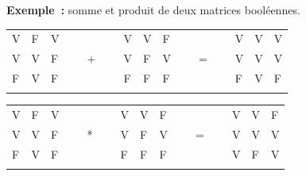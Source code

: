 			\textbf{Exemple~:} somme et produit de deux matrices booléennes.

			\begin{center}
				\tablefirsthead{}
				\tablehead{}
				\tabletail{}
				\tablelasttail{}
				\begin{supertabular}{|m{0.601cm}|m{0.601cm}|m{0.601cm}|m{0.601cm}m{0.601cm}m{0.601cm}|m{0.601cm}|m{0.601cm}|m{0.601cm}|m{0.601cm}m{0.601cm}m{0.601cm}|m{0.601cm}|m{0.601cm}|m{0.61800003cm}|}
				\hhline{---~~~---~~~---}
				{ V} &
				{ F} &
				{ V} &
				~
				 &
				~
				 &
				~
				 &
				{ V} &
				{ V} &
				{ F} &
				~
				 &
				~
				 &
				~
				 &
				{ V} &
				{ V} &
				{ V}\\\hhline{---~~~---~~~---}
				{ V} &
				{ V} &
				{ F} &
				~
				 &
				{ +} &
				~
				 &
				{ V} &
				{ F} &
				{ V} &
				~
				 &
				{ =} &
				~
				 &
				{ V} &
				{ V} &
				{ V}\\\hhline{---~~~---~~~---}
				{ F} &
				{ V} &
				{ F} &
				~
				 &
				~
				 &
				~
				 &
				{ F} &
				{ F} &
				{ F} &
				~
				 &
				~
				 &
				~
				 &
				{ F} &
				{ V} &
				{ F}\\\hhline{---~~~---~~~---}
				\end{supertabular}
			\end{center}

			\begin{center}
				\tablefirsthead{}
				\tablehead{}
				\tabletail{}
				\tablelasttail{}
				\begin{supertabular}{|m{0.601cm}|m{0.601cm}|m{0.601cm}|m{0.601cm}m{0.601cm}m{0.601cm}|m{0.601cm}|m{0.601cm}|m{0.601cm}|m{0.601cm}m{0.601cm}m{0.601cm}|m{0.601cm}|m{0.601cm}|m{0.61800003cm}|}
				\hhline{---~~~---~~~---}
				{ V} &
				{ F} &
				{ V} &
				~
				 &
				~
				 &
				~
				 &
				{ V} &
				{ V} &
				{ F} &
				~
				 &
				~
				 &
				~
				 &
				{ V} &
				{ V} &
				{ F}\\\hhline{---~~~---~~~---}
				{ V} &
				{ V} &
				{ F} &
				~
				 &
				{ *} &
				~
				 &
				{ V} &
				{ F} &
				{ V} &
				~
				 &
				{ =} &
				~
				 &
				{ V} &
				{ V} &
				{ V}\\\hhline{---~~~---~~~---}
				{ F} &
				{ V} &
				{ F} &
				~
				 &
				~
				 &
				~
				 &
				{ F} &
				{ F} &
				{ F} &
				~
				 &
				~
				 &
				~
				 &
				{ V} &
				{ F} &
				{ V}\\\hhline{---~~~---~~~---}
				\end{supertabular}
			\end{center}

